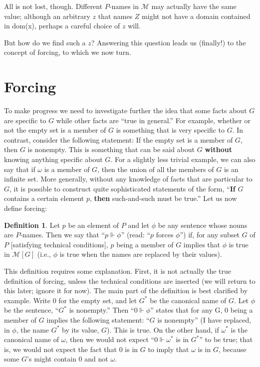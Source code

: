 \documentclass[10pt]{article}
\theoremstyle{definition}
\newtheorem*{defn}{Definition}
\begin{document}
All is not lost, though. Different $P$-names in $\mathcal{M}$ may actually have the same value; although an arbitrary $z$ that names $Z$ might not have a domain contained in dom(x), perhaps a careful choice of $z$ will.

But how do we find such a $z$? Answering this question leads us (finally!) to the concept of forcing, to which we now turn.


\section{Forcing}

To make progress we need to investigate further the idea that some facts about $G$ are specific to $G$ while other facts are ``true in general.'' For example, whether or not the empty set is a member of $G$ is something that is very specific to $G$. In contrast, consider the following statement: If the empty set is a member of $G$, then $G$ is nonempty. This is something that can be said about $G$ \textbf{without} knowing anything specific about $G$. For a slightly less trivial example, we can also say that if $\omega$ is a member of $G$, then the union of all the members of $G$ is an infinite set. More generally, without any knowledge of facts that are particular to $G$, it is possible to construct quite sophisticated statements of the form, ``\textbf{If} $G$ contains a certain element $p$, \textbf{then} such-and-such must be true.'' Let us now define forcing:

\begin{defn}
Let $p$ be an element of $P$ and let $\phi$ be any sentence whose nouns are $P$-names. Then we say that ``$p \Vdash \phi$'' (read: ``$p$ forces $\phi$'') if, for any subset $G$ of $P$ [satisfying technical conditions], $p$ being a member of $G$ implies that $\phi$ is true in $\mathcal{M}[G]$ (i.e., $\phi$ is true when the names are replaced by their values).
\end{defn}

This definition requires some explanation. First, it is not actually the true definition of forcing, unless the technical conditions are inserted (we will return to this later; ignore it for now). The main part of the definition is best clarified by example. Write $0$ for the empty set, and let $G^*$ be the canonical name of $G$. Let $\phi$ be the sentence, ``$G^*$ is nonempty.'' Then ``$0 \Vdash \phi$'' states that for any G, 0 being a member of $G$ implies the following statement: ``$G$ is nonempty'' (I have replaced, in $\phi$, the name $G^*$ by its value, $G$). This is true. On the other hand, if $\omega^*$ is the canonical name of $\omega$, then we would not expect ``$0 \Vdash \omega^*$ is in $G^*$'' to be true; that is, we would not expect the fact that $0$ is in $G$ to imply that $\omega$ is in $G$, because some $G$'s might contain $0$ and not $\omega$.
\end{document}
